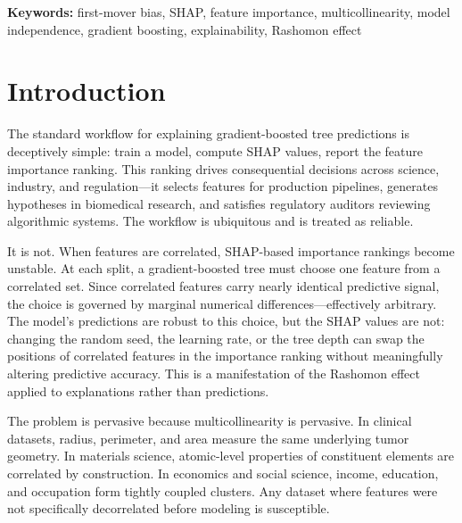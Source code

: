\documentclass[11pt]{article}
\begin{document}
\smallskip
\noindent\textbf{Keywords:} first-mover bias, SHAP, feature importance,
multicollinearity, model independence, gradient boosting, explainability,
Rashomon effect

\section{Introduction}
\label{sec:introduction}

The standard workflow for explaining gradient-boosted tree predictions is
deceptively simple: train a model, compute SHAP values, report the feature
importance ranking. This ranking drives consequential decisions across
science, industry, and regulation---it selects features for production
pipelines, generates hypotheses in biomedical research, and satisfies
regulatory auditors reviewing algorithmic systems. The workflow is
ubiquitous and is treated as reliable.

It is not. When features are correlated, SHAP-based importance rankings
become unstable. At each split, a gradient-boosted tree must choose one
feature from a correlated set. Since correlated features carry nearly
identical predictive signal, the choice is governed by marginal numerical
differences---effectively arbitrary. The model's predictions are robust to
this choice, but the SHAP values are not: changing the random seed, the
learning rate, or the tree depth can swap the positions of correlated
features in the importance ranking without meaningfully altering predictive
accuracy. This is a manifestation of the Rashomon effect
\citep{breiman2001statistical} applied to explanations rather than
predictions.

The problem is pervasive because multicollinearity is pervasive. In
clinical datasets, radius, perimeter, and area measure the same underlying
tumor geometry. In materials science, atomic-level properties of
constituent elements are correlated by construction. In economics and
social science, income, education, and occupation form tightly coupled
clusters. Any dataset where features were not specifically decorrelated
before modeling is susceptible.
\end{document}
